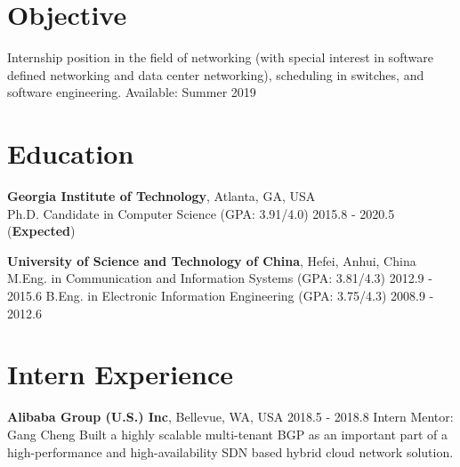 \documentclass[line,11pt,letter]{/home/saber/GitHub/personal-resume/includes/cls/myRes}
\begin{document}

\address{266 Ferst Dr, Atlanta, GA 30332, United States}
\address{Cell: +1(404)697-0608. \hspace{5pt} Email: gonglong@gatech.edu}
\begin{resume}


\vspace*{-10pt}
\vspace*{-15pt}
\section{Objective}
\vspace{-4pt}
{\setlength{\parskip}{0pt}
 {Internship position in the field of networking (with special interest in software defined networking and data center networking), scheduling in switches, and software engineering. \hfill{Available: Summer 2019}\break}
}%
\negspace
\section{Education}
\vspace{-4pt}
{\setlength{\parskip}{0pt}
\textbf{Georgia Institute of Technology}, Atlanta, GA, USA\\
{\hspace*{1em} Ph.D. Candidate in Computer Science (GPA: 3.91/4.0) \hspace{52.5pt} \hfill 2015.8 - 2020.5 (\textbf{Expected})\break}
}
\sspace

{\setlength{\parskip}{0pt}
\textbf{University of Science and Technology of China}, Hefei, Anhui, China\\
{\hspace*{1em} M.Eng. in Communication and Information Systems (GPA: 3.81/4.3) \hspace{52.5pt} \hfill 2012.9 - 2015.6\break}
{\hspace*{1em} B.Eng. in Electronic Information Engineering (GPA: 3.75/4.3) \hspace{52.5pt} \hfill 2008.9 - 2012.6\break}
}
\negspace
\section{Intern Experience}
\vspace{-4pt}
{\setlength{\parskip}{0pt}
{\bf Alibaba Group (U.S.) Inc}, Bellevue, WA, USA \hfill 2018.5 - 2018.8\break
{\hspace*{1em} Intern \hfill Mentor: Gang Cheng\break}
{\hspace*{1em} Built a highly scalable multi-tenant BGP as an important part of a high-performance and high-availability SDN based hybrid cloud network solution.}
}


\end{resume}
\end{document}
